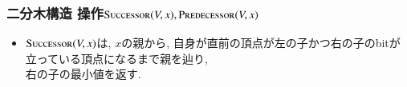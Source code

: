 \documentclass[main]{subfiles}
\begin{document}
\begin{frame}\frametitle{二分木構造 操作{\small $\mathrm{\text{S\textsc{uccessor}}}(V,x), \mathrm{\text{P\textsc{redecessor}}}(V,x)$}}
\begin{itemize}
\item $\mathrm{\text{S\textsc{uccessor}}}(V,x)$は, $x$の親から, 自身が直前の頂点が左の子かつ右の子のbitが立っている頂点になるまで親を辿り, \\右の子の最小値を返す. 
\end{itemize}
\begin{columns}[t]
\begin{column}{0.45\linewidth} \end{column}
\begin{column}{0.54\linewidth} \end{column}
\end{columns}

\end{frame}
\end{document}
